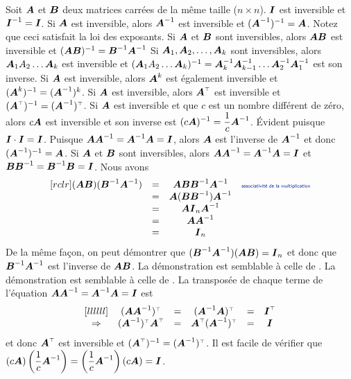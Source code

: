 \begin{theo}
 Soit $\boldsymbol{A}$ et $\boldsymbol{B}$ deux matrices carrées de la même taille ($n\times n$).  
   $\boldsymbol{I}$ est inversible et $\boldsymbol{I}^{-1} = \boldsymbol{I}$.
   Si $\boldsymbol{A}$ est inversible, alors $\boldsymbol{A}^{-1}$ est inversible et $(\boldsymbol{A}^{-1})^{-1} = \boldsymbol{A}$. Notez que ceci satisfait la loi des exposants.
  Si $\boldsymbol{A}$ et $\boldsymbol{B}$ sont inversibles, alors $\boldsymbol{A}\boldsymbol{B}$ est inversible et $(\boldsymbol{A}\boldsymbol{B})^{-1} = \boldsymbol{B}^{-1}\boldsymbol{A}^{-1}$
  Si $\boldsymbol{A}_1, \boldsymbol{A}_2, \ldots, \boldsymbol{A}_k$ sont inversibles, alors $\boldsymbol{A}_1A_2 \ldots \boldsymbol{A}_k$ est inversible et $(\boldsymbol{A}_1A_2 \ldots \boldsymbol{A}_k)^{-1} = \boldsymbol{A}_k^{-1}\boldsymbol{A}_{k-1}^{-1}\ldots \boldsymbol{A}_2^{-1}\boldsymbol{A}_1^{-1}$ est son inverse.
  Si $\boldsymbol{A}$ est inversible, alors $\boldsymbol{A}^k$ est également inversible et $(\boldsymbol{A}^k)^{-1} = (\boldsymbol{A}^{-1})^k$.
  Si $\boldsymbol{A}$ est inversible, alors $\transp{\matA}$ est inversible et $(\transp{\matA})^{-1} = \transp{(\matA^{-1})}$.
  Si $\boldsymbol{A}$ est inversible et que $c$ est un nombre
 différent de zéro, alors $c\boldsymbol{A}$ est inversible et son
 inverse est $\displaystyle (c\boldsymbol{A})^{-1} = \frac{1}{c}\boldsymbol{A}^{-1}$.
\proof
  Évident puisque $\boldsymbol{I}\cdot \boldsymbol{I} = \boldsymbol{I}$.
   Puisque $\boldsymbol{A}\boldsymbol{A}^{-1} = \boldsymbol{A}^{-1}\boldsymbol{A}=\boldsymbol{I}$, alors $\boldsymbol{A}$ est l'inverse de $\boldsymbol{A}^{-1}$ et donc
$(\boldsymbol{A}^{-1})^{-1} = \boldsymbol{A}$.
  Si $\boldsymbol{A}$ et $\boldsymbol{B}$ sont inversibles, alors $\boldsymbol{A}\boldsymbol{A}^{-1} = \boldsymbol{A}^{-1}\boldsymbol{A}=\boldsymbol{I}$ et $\boldsymbol{B}\boldsymbol{B}^{-1} = \boldsymbol{B}^{-1}\boldsymbol{B}=\boldsymbol{I}$.  Nous avons
\[
\begin{matrix}[rclr]
(\matA\matB)(\matB^{-1}\matA^{-1}) &=& \matA\matB\matB^{-1}\matA^{-1} &\explain{associativité de la multiplication} \\
                       &=& \matA(\matB\matB^{-1})\matA^{-1}  \\
                       &=& \matA\matI_n \matA^{-1} \\
                       &=& \matA\matA^{-1}\\
                       &=& \matI_n
\end{matrix} 
\]
De la même façon, on peut démontrer que $(\boldsymbol{B}^{-1}\boldsymbol{A}^{-1}) (\boldsymbol{A}\boldsymbol{B}) = \boldsymbol{I}_n$ et donc que $\boldsymbol{B}^{-1}\boldsymbol{A}^{-1}$ est 
l'inverse de $\boldsymbol{A}\boldsymbol{B}$.
 La démonstration est semblable à celle de \textbf{\color{ExerciceCouleur}{(c)}}.
 La démonstration est semblable à celle de \textbf{\color{ExerciceCouleur}{(c)}}.
  La transposée de chaque terme de l'équation $\boldsymbol{A}\boldsymbol{A}^{-1} = \boldsymbol{A}^{-1}\boldsymbol{A}=\boldsymbol{I}$
 est \[
 \begin{matrix}[llllll]
 & \transp{(\matA\matA^{-1})} &=& \transp{(\matA^{-1}\matA)} &=&\transp{\matI}\\
 \Rightarrow & \transp{(\matA^{-1})}\transp{\matA} &=& \transp{\matA}\transp{(\matA^{-1})} &=& \matI
 \end{matrix}
 \]
 et donc $\transp{\matA}$ est inversible et $(\transp{\matA})^{-1} = \transp{(\matA^{-1})}$.
   Il est facile de vérifier que
  $\displaystyle(c\boldsymbol{A})\left(\frac{1}{c}\boldsymbol{A}^{-1}\right) = \left(\frac{1}{c}\boldsymbol{A}^{-1}\right)(c\boldsymbol{A}) = \boldsymbol{I}$. \cqfd
 \end{theo}
 
